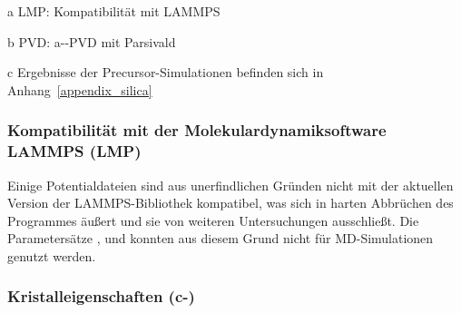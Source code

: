 \begin{table}[th]
\begin{threeparttable}

    \begin{tablenotes}[para]
      \item[a] LMP: Kompatibilität mit LAMMPS
      \item[b] PVD: a--PVD mit Parsivald
      \item[c] Ergebnisse der Precursor-Simulationen befinden sich in Anhang~\ref{appendix_silica}
    \end{tablenotes}
  \end{threeparttable}
\end{table}

\subsubsection{Kompatibilität mit der Molekulardynamiksoftware LAMMPS (LMP)}

Einige Potentialdateien sind aus unerfindlichen Gründen nicht mit der aktuellen Version der LAMMPS-Bibliothek kompatibel, was sich in harten Abbrüchen des Programmes äußert und sie von weiteren Untersuchungen ausschließt.
Die Parametersätze ,  und  konnten aus diesem Grund nicht für MD-Simulationen genutzt werden.

\subsubsection{Kristalleigenschaften (c-)}

